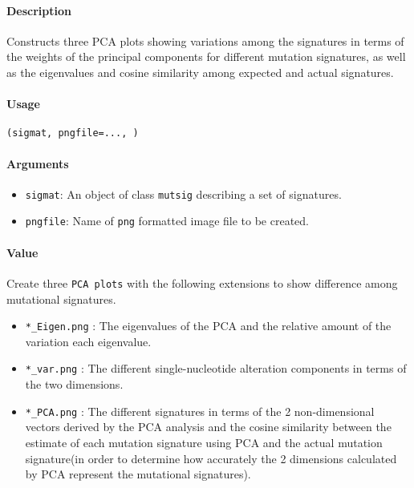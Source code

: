 \documentclass[]{article}
\providecommand{\tightlist}{%
  \setlength{\itemsep}{0pt}\setlength{\parskip}{0pt}}
\let\oldparagraph\paragraph
\renewcommand{\paragraph}[1]{\oldparagraph{#1}\mbox{}}
\begin{document}
\paragraph{\texorpdfstring{\textbf{Description}}{Description}}\label{description-8}

Constructs three PCA plots showing variations among the signatures in
terms of the weights of the principal components for different mutation
signatures, as well as the eigenvalues and cosine similarity among
expected and actual signatures.

\paragraph{\texorpdfstring{\textbf{Usage}}{Usage}}\label{usage-9}

\texttt{(sigmat,\ pngfile=...,\ )}

\paragraph{\texorpdfstring{\textbf{Arguments
}}{Arguments }}\label{arguments-8}

\begin{itemize}
\tightlist
\item
  \texttt{sigmat}: An object of class \texttt{mutsig} describing a set
  of signatures.
\item
  \texttt{pngfile}: Name of \texttt{png} formatted image file to be
  created.
\end{itemize}

\paragraph{\texorpdfstring{\textbf{Value}}{Value}}\label{value-7}

Create three \texttt{PCA\ plots} with the following extensions to show
difference among mutational signatures.

\begin{itemize}
\tightlist
\item
  \texttt{*\_Eigen.png} : The eigenvalues of the PCA and the relative
  amount of the variation each eigenvalue.
\item
  \texttt{*\_var.png} : The different single-nucleotide alteration
  components in terms of the two dimensions.
\item
  \texttt{*\_PCA.png} : The different signatures in terms of the 2
  non-dimensional vectors derived by the PCA analysis and the cosine
  similarity between the estimate of each mutation signature using PCA
  and the actual mutation signature(in order to determine how accurately
  the 2 dimensions calculated by PCA represent the mutational
  signatures).
\end{itemize}
\end{document}
